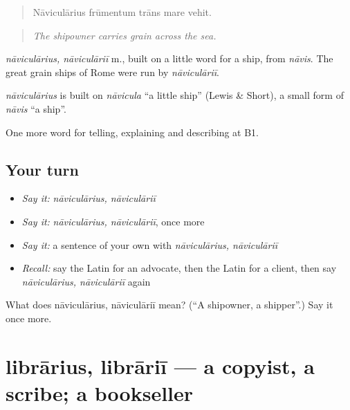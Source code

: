 \begin{quote}
Nāviculārius frūmentum trāns mare vehit.
\end{quote}

\begin{quote}
\emph{The shipowner carries grain across the sea.}
\end{quote}

\emph{nāviculārius, nāviculāriī} m., built on a little word for a ship, from \emph{nāvis}. The great grain ships of Rome were run by \emph{nāviculāriī}.

\begin{cousinweb}
\emph{nāviculārius} is built on \emph{nāvicula} \textquotedblleft{}a little ship\textquotedblright{} (Lewis \& Short), a small form of \emph{nāvis} \textquotedblleft{}a ship\textquotedblright{}.
\end{cousinweb}

\begin{grammarlens}[title={What you've built}]
One more word for telling, explaining and describing at B1.
\end{grammarlens}

\subsection*{Your turn}
\begin{itemize}
\raggedright
  \item \emph{Say it:} \emph{nāviculārius, nāviculāriī}
  \item \emph{Say it:} \emph{nāviculārius, nāviculāriī}, once more
  \item \emph{Say it:} a sentence of your own with \emph{nāviculārius, nāviculāriī}
  \item \emph{Recall:} say the Latin for an advocate, then the Latin for a client, then say \emph{nāviculārius, nāviculāriī} again
\end{itemize}

\begin{tcolorbox}[breakable,colback=teal!4,colframe=teal!35!black,title={Before you move on}]
What does nāviculārius, nāviculāriī mean? (\textquotedblleft{}A shipowner, a shipper\textquotedblright{}.) Say it once more.
\end{tcolorbox}
\section[librārius, librāriī]{librārius, librāriī — a copyist, a scribe; a bookseller}

